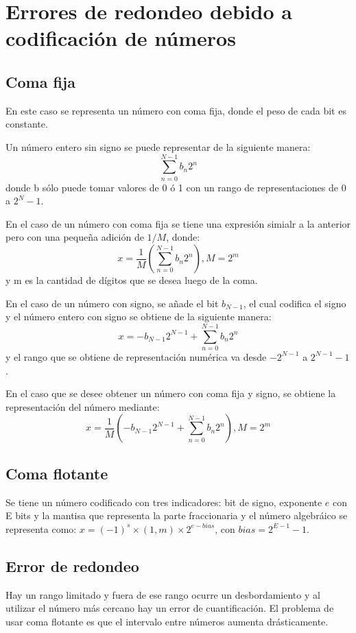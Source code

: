 \documentclass[letterpaper, 12pt, twoside]{article}
\begin{document}
	\section{Errores de redondeo debido a codificación de números}
	\subsection{Coma fija}
	En este caso se representa un número con coma fija, donde el peso de cada bit es constante.
	\bigskip
	
	Un número entero sin signo se puede representar de la siguiente manera:$$\sum_{n=0}^{N-1}b_n2^n$$donde b sólo puede tomar valores de 0 ó 1 con un rango de representaciones de 0 a $2^N-1$.
	\bigskip
	
	En el caso de un número con coma fija se tiene una expresión simialr a la anterior pero con
	una pequeña adición de $1/M$, donde: $$x = \frac{1}{M}\left(\sum_{n=0}^{N-1}b_n2^n\right), M = 2^m$$ y m es la cantidad de dígitos que se desea luego de la coma.
	\bigskip
	
	En  el  caso  de  un  número  con  signo,  se  añade  el  bit $b_{N-1}$, el  cual  codifica  el  signo  y  el número entero con signo se obtiene de la siguiente manera: $$x = -b_{N-1}2^{N-1}+\sum_{n=0}^{N-1}b_n2^n$$ y el rango que se obtiene de representación numérica va desde $-2^{N-1}$ a $2^{N-1}-1$.
	\bigskip
	
	En  el  caso  que  se  desee  obtener  un  número  con  coma  fija  y  signo,  se  obtiene  la  representación del número mediante: $$x = \frac{1}{M}\left( -b_{N-1}2^{N-1}+\sum_{n=0}^{N-1}b_n2^n \right), M =2^m$$
	\subsection{Coma flotante}
	Se tiene un número codificado con tres indicadores:  bit de signo, exponente $e$
	con E bits y la mantisa que representa la parte fraccionaria y el número algebráico se representa como: $x=(-1)^s\times(1,m)\times2^{e-bias}$, con $bias = 2^{E-1}-1$.
	\subsection{Error de redondeo}
	Hay  un  rango  limitado  y  fuera  de  ese  rango  ocurre  un  desbordamiento  y  al  utilizar  el
	número más cercano hay un error de cuantificación.  El problema de usar coma flotante
	es que el intervalo entre números aumenta drásticamente.
	\bigskip
	
\end{document}
